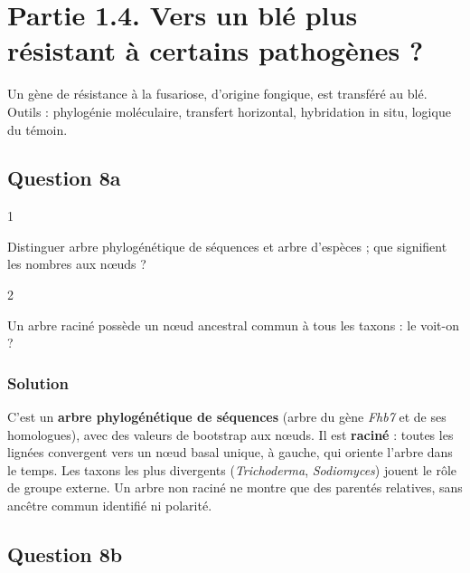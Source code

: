 \documentclass[11pt,a4paper]{article}
\begin{document}
\hypertarget{partie-1.4.-vers-un-bluxe9-plus-ruxe9sistant-uxe0-certains-pathoguxe8nes}{%
\section{Partie 1.4. Vers un blé plus résistant à certains pathogènes ?}\label{partie-1.4.-vers-un-bluxe9-plus-ruxe9sistant-uxe0-certains-pathoguxe8nes}}

Un gène de résistance à la fusariose, d'origine fongique, est transféré au blé. Outils : phylogénie moléculaire, transfert horizontal, hybridation in situ, logique du témoin.

\hypertarget{question-8a}{%
\subsection{Question 8a}\label{question-8a}}

\begin{indication}{1}

Distinguer arbre phylogénétique de séquences et arbre d'espèces ; que signifient les nombres aux nœuds ?

\end{indication}

\begin{indication}{2}

Un arbre raciné possède un nœud ancestral commun à tous les taxons : le voit-on ?

\end{indication}

\hypertarget{solution-20}{%
\subsubsection{Solution}\label{solution-20}}

C'est un \textbf{arbre phylogénétique de séquences} (arbre du gène \emph{Fhb7} et de ses homologues), avec des valeurs de bootstrap aux nœuds. Il est \textbf{raciné} : toutes les lignées convergent vers un nœud basal unique, à gauche, qui oriente l'arbre dans le temps. Les taxons les plus divergents (\emph{Trichoderma}, \emph{Sodiomyces}) jouent le rôle de groupe externe. Un arbre non raciné ne montre que des parentés relatives, sans ancêtre commun identifié ni polarité.

\hypertarget{question-8b}{%
\subsection{Question 8b}\label{question-8b}}
\end{document}
